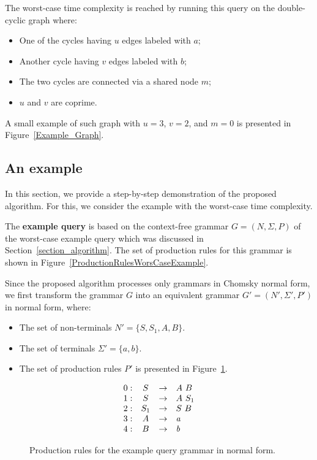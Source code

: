 The worst-case time complexity is reached by running this query on the double-cyclic graph where:
\begin{itemize}
	\item One of the cycles having $u$ edges labeled with $a$;
	\item Another cycle having $v$ edges labeled with $b$;
	\item The two cycles are connected via a shared node $m$;
	\item $u$ and $v$ are coprime.
\end{itemize}

A small example of such graph with $u = 3$, $v = 2$, and $m = 0$ is presented in Figure~\ref{Example_Graph}.

\subsection{An example} \label{section_example}
In this section, we provide a step-by-step demonstration of the proposed algorithm. For this, we consider the example with the worst-case time complexity.

The \textbf{example query} is based on the context-free grammar $G = (N, \Sigma, P)$ of the worst-case example query which was discussed in Section~\ref{section_algorithm}. The set of production rules for this grammar is shown in Figure~\ref{ProductionRulesWorsCaseExample}.

Since the proposed algorithm processes only grammars in Chomsky normal form, we first transform the grammar $G$ into an equivalent grammar $G' = (N', \Sigma', P')$ in normal form, where:
\begin{itemize}
    \item The set of non-terminals $N' = \{S, S_1, A, B\}$.
    \item The set of terminals $\Sigma' = \{a, b\}.$
    \item The set of production rules $P'$ is presented in Figure~\ref{ProductionRulesExampleQueryCNF}.
\end{itemize}

\begin{figure}[h]
   \[
\begin{array}{rccl}
   0: & S & \rightarrow & A \ B \\
   1: & S & \rightarrow & A \ S_1 \\
   2: & S_1 & \rightarrow & S \ B \\
   3: & A & \rightarrow & \text{\textit{a}} \\ 
   4: & B & \rightarrow & \text{\textit{b}} \\ 
\end{array}
\]
\caption{Production rules for the example query grammar in normal form.}
\label{ProductionRulesExampleQueryCNF}
\end{figure}

